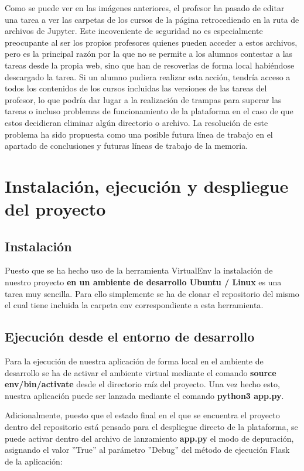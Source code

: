 Como se puede ver en las imágenes anteriores, el profesor ha pasado de editar una tarea a ver las carpetas de los cursos de la página retrocediendo en la ruta de archivos de Jupyter. Este incoveniente de seguridad no es especialmente preocupante al ser los propios profesores quienes pueden acceder a estos archivos, pero es la principal razón por la que no se permite a los alumnos contestar a las tareas desde la propia web, sino que han de resoverlas de forma local habiéndose descargado la tarea. Si un alumno pudiera realizar esta acción, tendría acceso a todos los contenidos de los cursos incluidas las versiones de las tareas del profesor, lo que podría dar lugar a la realización de trampas para superar las tareas o incluso problemas de funcionamiento de la plataforma en el caso de que estos decidieran eliminar algún directorio o archivo. La resolución de este problema ha sido propuesta como una posible futura línea de trabajo en el apartado de conclusiones y futuras líneas de trabajo de la memoria.

\section{Instalación, ejecución y despliegue del proyecto}

\subsection{Instalación}
Puesto que se ha hecho uso de la herramienta VirtualEnv la instalación de nuestro proyecto \textbf{en un ambiente de desarrollo Ubuntu / Linux} es una tarea muy sencilla. Para ello simplemente se ha de clonar el repositorio del mismo el cual tiene incluida la carpeta env correspondiente a esta herramienta.

\subsection{Ejecución desde el entorno de desarrollo}

Para la ejecución de nuestra aplicación de forma local en el ambiente de desarrollo se ha de activar el ambiente virtual mediante el comando \textbf{source env/bin/activate} desde el directorio raíz del proyecto. Una vez hecho esto, nuestra aplicación puede ser lanzada mediante el comando \textbf{python3 app.py}.

Adicionalmente, puesto que el estado final en el que se encuentra el proyecto dentro del repositorio está pensado para el despliegue directo de la plataforma, se puede activar dentro del archivo de lanzamiento \textbf{app.py} el modo de depuración, asignando el valor ''True'' al parámetro ''Debug'' del método de ejecución Flask de la aplicación:


